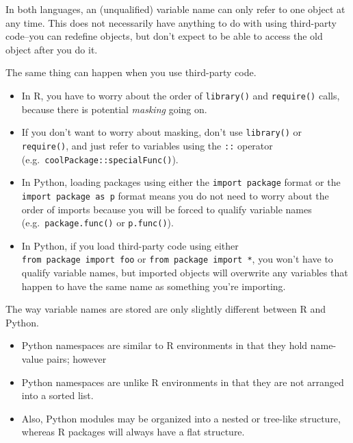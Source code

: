 \documentclass[
  12pt,
  krantz2]{krantz}
\providecommand{\tightlist}{%
  \setlength{\itemsep}{0pt}\setlength{\parskip}{0pt}}
\begin{document}
\begin{rmd-details}

In both languages, an (unqualified) variable name can only refer to one object at any time. This does not necessarily have anything to do with using third-party code--you can redefine objects, but don't expect to be able to access the old object after you do it.

The same thing can happen when you use third-party code.

\begin{itemize}
\tightlist
\item
  In R, you have to worry about the order of \texttt{library()} and \texttt{require()} calls, because there is potential \emph{masking} going on.
\item
  If you don't want to worry about masking, don't use \texttt{library()} or \texttt{require()}, and just refer to variables using the \texttt{::} operator (e.g.~\texttt{coolPackage::specialFunc()}).
\item
  In Python, loading packages using either the \texttt{import\ package} format or the \texttt{import\ package\ as\ p} format means you do not need to worry about the order of imports because you will be forced to qualify variable names (e.g.~\texttt{package.func()} or \texttt{p.func()}).
\item
  In Python, if you load third-party code using either \texttt{from\ package\ import\ foo} or \texttt{from\ package\ import\ *}, you won't have to qualify variable names, but imported objects will overwrite any variables that happen to have the same name as something you're importing.
\end{itemize}

The way variable names are stored are only slightly different between R and Python.

\begin{itemize}
\tightlist
\item
  Python namespaces are similar to R environments in that they hold name-value pairs; however
\item
  Python namespaces are unlike R environments in that they are not arranged into a sorted list.
\item
  Also, Python modules may be organized into a nested or tree-like structure, whereas R packages will always have a flat structure.
\end{itemize}

\end{rmd-details}
\end{document}
